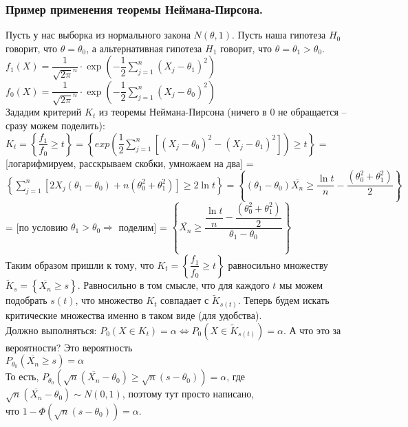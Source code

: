 \subsubsection{Пример применения теоремы Неймана-Пирсона.}
\begin{example}
    Пусть у нас выборка из нормального закона $N(\theta, 1)$. Пусть наша гипотеза $H_0$ говорит, что
    $\theta = \theta_0$, а альтернативная гипотеза $H_1$ говорит, что $\theta = \theta_1 > \theta_0$. \\
    
    $f_1(X) = \dfrac{1}{\sqrt{2\pi}^n} \cdot \exp(-\dfrac{1}{2} \sum_{j = 1}^{n} (X_j - \theta_1)^2)$ \\
    $f_0(X) = \dfrac{1}{\sqrt{2\pi}^n} \cdot \exp(-\dfrac{1}{2} \sum_{j = 1}^{n} (X_j - \theta_0)^2)$ \\

    Зададим критерий $K_t$ из теоремы Неймана-Пирсона (ничего в 0 не обращается --
    сразу можем поделить): \\ $K_t = \left\{\dfrac{f_1}{f_0} \geqslant t\right\} =
    \left \{exp \left( \dfrac{1}{2} \sum_{j = 1}^{n}[(X_j - \theta_0)^2 - (X_j - \theta_1)^2] \right) \geqslant t \right \}$ =
    [логарифмируем, расскрываем скобки, умножаем на два]  = $\left \{\sum_{j = 1}^n[2X_j(\theta_1 - \theta_0) +
     n(\theta_0^2 + \theta_1^2)] \geqslant 2\ln t \right \} =
     \left \{(\theta_1 - \theta_0) \overline{X_n} \geqslant \dfrac{\ln t}{n} - \dfrac{(\theta_0^2 + \theta_1^2)}{2} \right \}$
     = [по условию $\theta_1 > \theta_0 \Rightarrow$ поделим] =
     $\left \{\overline{X_n} \geqslant \dfrac{\dfrac{\ln t}{n} - \dfrac{(\theta_0^2 + \theta_1^2)}{2}}{\theta_1 - \theta_0} \right \}$ \\
     
     Таким образом пришли к тому, что $K_t =\left\{\dfrac{f_1}{f_0} \geqslant t\right\}$ равносильно
     множеству $\widetilde{K}_{s} = \left \{\overline{X_n} \geqslant s \right \}$. Равносильно в
     том смысле, что для каждого $t$ мы можем подобрать $s(t)$, что множество $K_t$ совпадает с
     $\widetilde{K}_{s(t)}$. Теперь будем искать критические множества именно в таком виде (для удобства). \\
     
    Должно выполняться: $P_0(X \in K_t) = \alpha \Leftrightarrow P_0(X \in \widetilde{K}_{s(t)}) = \alpha$.
    А что это за вероятности? Это вероятность \\ $P_{\theta_0}(\overline{X_n} \geqslant s) = \alpha$ \\
    То есть, $P_{\theta_0}(\sqrt{n}(\overline{X_n} - \theta_0) \geqslant \sqrt{n}(s - \theta_0)) = \alpha$,
    где $\sqrt{n}(\overline{X_n} - \theta_0) \sim N(0, 1)$, поэтому тут просто написано,\\ что
    $1 - \Phi(\sqrt{n}(s - \theta_0)) = \alpha$. \\
    

\end{example}
